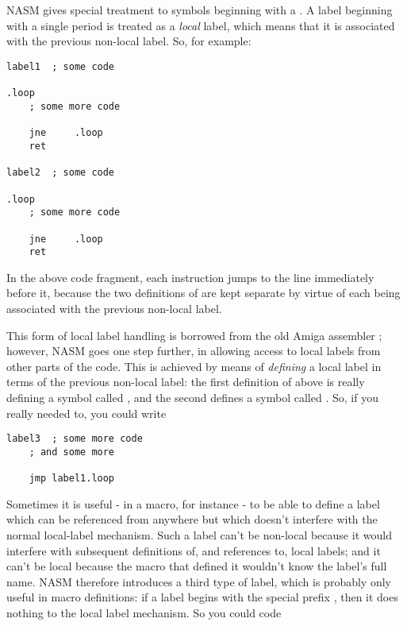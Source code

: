 \section{}
\label{sec:locallab}

NASM gives special treatment to symbols beginning with a .
A label beginning with a single period is treated as a \emph{local}
label, which means that it is associated with the previous non-local
label. So, for example:

\begin{lstlisting}
label1	; some code

.loop
	; some more code

	jne     .loop
	ret

label2	; some code

.loop
	; some more code

	jne     .loop
	ret
\end{lstlisting}

In the above code fragment, each  instruction jumps to the
line immediately before it, because the two definitions of
 are kept separate by virtue of each being associated
with the previous non-local label.

This form of local label handling is borrowed from the old Amiga
assembler ; however, NASM goes one step further,
in allowing access to local labels from other parts of the code. This
is achieved by means of \emph{defining} a local label in terms of the
previous non-local label: the first definition of  above is
really defining a symbol called , and the second
defines a symbol called . So, if you really needed
to, you could write

\begin{lstlisting}
label3	; some more code
	; and some more

	jmp label1.loop
\end{lstlisting}

Sometimes it is useful - in a macro, for instance - to be able to
define a label which can be referenced from anywhere but which
doesn't interfere with the normal local-label mechanism. Such a
label can't be non-local because it would interfere with subsequent
definitions of, and references to, local labels; and it can't be
local because the macro that defined it wouldn't know the label's
full name. NASM therefore introduces a third type of label, which is
probably only useful in macro definitions: if a label begins with
the special prefix , then it
does nothing to the local label mechanism. So you could code

